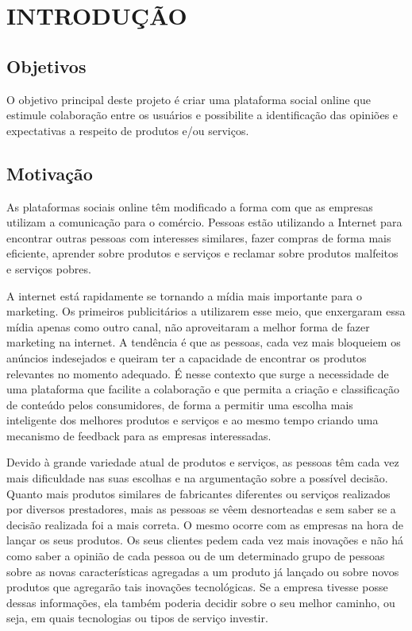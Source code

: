 \chapter{INTRODUÇÃO}

\section{Objetivos}

     O objetivo principal deste projeto é criar uma plataforma social online que estimule colaboração entre os usuários e possibilite a identificação das opiniões e expectativas a respeito de produtos e/ou serviços.



\section{Motivação}

 As plataformas sociais online têm modificado a forma com que as empresas utilizam a comunicação para o comércio. Pessoas estão utilizando a Internet para encontrar outras pessoas com interesses similares, fazer compras de forma mais eficiente, aprender sobre produtos e serviços e reclamar sobre produtos malfeitos e serviços pobres\cite{marketing_social_web}.
 
    A internet está rapidamente se tornando a mídia mais importante para o marketing. Os primeiros publicitários a utilizarem esse meio, que enxergaram essa mídia apenas como outro canal, não aproveitaram a melhor forma de fazer marketing na internet. A tendência é que as pessoas, cada vez mais bloqueiem os anúncios indesejados e queiram ter a capacidade de encontrar os produtos relevantes no momento adequado. É nesse contexto que surge a necessidade de uma plataforma que facilite a colaboração e que permita a criação e classificação de conteúdo pelos consumidores, de forma a permitir uma escolha mais inteligente dos melhores produtos e serviços e ao mesmo tempo criando uma mecanismo de feedback para as empresas interessadas.
 
    Devido à grande variedade atual de produtos e serviços, as pessoas têm cada vez mais dificuldade nas suas escolhas e na argumentação sobre a possível decisão. Quanto mais produtos similares de fabricantes diferentes ou serviços realizados por diversos prestadores, mais as pessoas se vêem desnorteadas e sem saber se a decisão realizada foi a mais correta. O mesmo ocorre com as empresas na hora de lançar os seus produtos. Os seus clientes pedem cada vez mais inovações e não há como saber a opinião de cada pessoa ou de um determinado grupo de pessoas sobre as novas características agregadas a um produto já lançado ou sobre novos produtos que agregarão tais inovações tecnológicas. Se a empresa tivesse posse dessas informações, ela também poderia decidir sobre o seu melhor caminho, ou seja, em quais tecnologias ou tipos de serviço investir.
 
